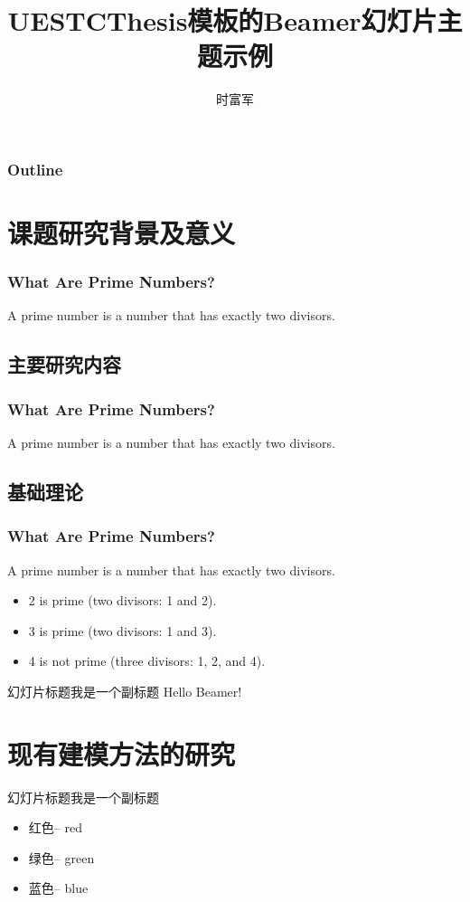 \documentclass{beamer}
\begin{document}
\begin{frame}
\title{UESTCThesis模板的Beamer幻灯片主题示例}
\author{时富军}
\titlepage
\end{frame}
\begin{frame}
\frametitle{Outline}
\tableofcontents[pausesections]
\end{frame}
\section{课题研究背景及意义}
\begin{frame}
\frametitle{What Are Prime Numbers?}
A prime number is a number that has exactly two divisors.
\end{frame}
\subsection{主要研究内容}
\begin{frame}
\frametitle{What Are Prime Numbers?}
\begin{definition}
A \alert{prime number} is a number that has exactly two divisors.
\end{definition}
\end{frame}
\subsection{基础理论}
\begin{frame}
\frametitle{What Are Prime Numbers?}
\begin{definition}
A \alert{prime number} is a number that has exactly two divisors.
\end{definition}
\begin{example}
\begin{itemize}
\item 2 is prime (two divisors: 1 and 2).
\item 3 is prime (two divisors: 1 and 3).
\item 4 is not prime (\alert{three} divisors: 1, 2, and 4).
\end{itemize}
\end{example}
\end{frame}
\begin{frame}{幻灯片标题}{我是一个副标题}
Hello Beamer!
\end{frame}
\section{现有建模方法的研究}
\begin{frame}{幻灯片标题}{我是一个副标题}
\begin{itemize}
\item 红色-- red
\item 绿色-- green
\item 蓝色-- blue
\end{itemize}
\end{frame}
\end{document}

